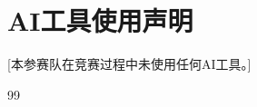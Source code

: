\documentclass{JXUSTmodeling}
\begin{document}









\section*{AI工具使用声明}

[本参赛队在竞赛过程中未使用任何AI工具。]


\begin{thebibliography}{99}
\end{thebibliography}
\label{body:end}
\end{document}

